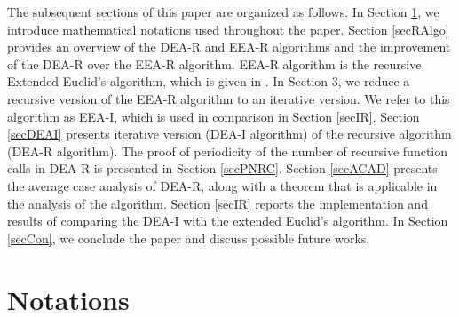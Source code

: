 \documentclass[pdflatex,sn-mathphys-num]{sn-jnl}%
\theoremstyle{thmstyleone}%
\theoremstyle{thmstyletwo}%
\theoremstyle{thmstylethree}%
\begin{document}
 
  \par The subsequent sections of this paper are organized as follows. In Section \ref{secNot}, we introduce mathematical notations used throughout the paper.  Section \ref{secRAlgo} provides an overview of the DEA-R and EEA-R algorithms and the improvement of the DEA-R over the EEA-R algorithm. EEA-R algorithm is the recursive Extended Euclid's algorithm, which is given in \cite{cormen2009introduction}. In Section 3, we reduce a recursive version of the EEA-R algorithm to an iterative version. We refer to this algorithm as EEA-I, which is used in comparison in Section \ref{secIR}. Section \ref{secDEAI} presents iterative version (DEA-I algorithm) of the recursive algorithm (DEA-R algorithm). The proof of periodicity of the number of recursive function calls in DEA-R is presented in Section \ref{secPNRC}.
  Section \ref{secACAD} presents the average case analysis of DEA-R, along with a theorem that is applicable in the analysis of the algorithm. Section \ref{secIR} reports the implementation and results of comparing the DEA-I with the extended Euclid's algorithm. In Section \ref{secCon}, we conclude the paper and discuss possible future works.

\section{Notations}\label{secNot}
\end{document}
